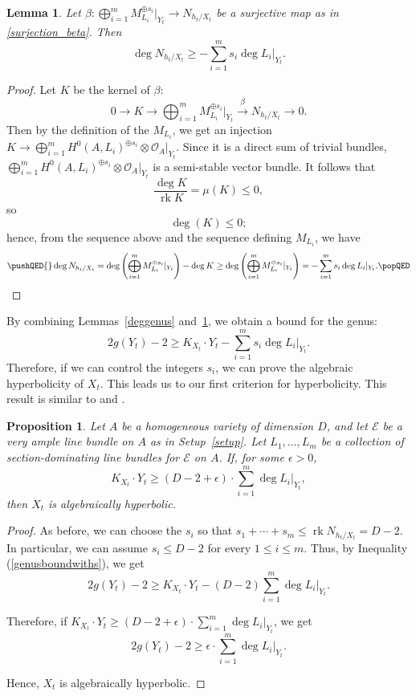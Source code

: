\documentclass[11pt]{amsart}
\numberwithin{equation}{section}
\newtheorem{lemma}[theorem]{Lemma}
\newtheorem{proposition}[theorem]{Proposition}
\theoremstyle{definition}
\theoremstyle{remark}
\newcommand{\cO}{\mathcal{O}}
\DeclareMathOperator{\rk}{rk}
\begin{document}
\begin{lemma}\label{surjectioninequality}
Let $\beta\colon \bigoplus _{i=1}^{m}M_{L_i}^{\oplus s_i}|_{Y_t}\to N_{h_t/X_t}$ be a surjective map as in \eqref{surjection_beta}. Then
\[ \deg N_{h_t/X_t}\ge -\sum_{i=1}^{m} s_i\deg L_i|_{Y_t}. \]
\end{lemma}
\begin{proof}
Let $K$ be the kernel of $\beta$:
\[ 0\longrightarrow K\longrightarrow \bigoplus _{i=1}^{m}M_{L_i}^{\oplus s_i}|_{Y_t}\overset{\beta}{\longrightarrow} N_{h_t/X_t}\longrightarrow 0. \]
Then by the definition of the $M_{L_i}$, we get an injection $K\to \bigoplus _{i=1}^{m}H^0(A,L_i)^{\oplus s_i}\otimes \cO_A|_{Y_t}$. Since it is a direct sum of trivial bundles, $\bigoplus _{i=1}^{m}H^0(A,L_i)^{\oplus s_i}\otimes \cO_A|_{Y_t}$ is a semi-stable vector bundle. It follows that
\[ \frac{\deg K}{\rk K} = \mu(K)\le 0, \]
so
\[ \deg (K)\le 0; \]
hence, from the sequence above and the sequence defining $M_{L_i}$, we have
\begin{equation*} \pushQED{\qed}
  \deg N_{h_t/X_t} = \deg \left (\bigoplus _{i=1}^{m}M_{L_i}^{\oplus s_i}|_{Y_t}\right ) - \deg K \ge \deg \left (\bigoplus _{i=1}^{m}M_{L_i}^{\oplus s_i}|_{Y_t}\right ) = -\sum_{i=1}^m s_i\deg L_i|_{Y_t}.\qedhere \popQED
  \end{equation*}
\renewcommand{\qed}{}   
\end{proof}

By combining Lemmas~\ref{deggenus} and~\ref{surjectioninequality}, we obtain a bound for the genus:
\begin{equation}\label{genusboundwiths}
     2g(Y_t)-2\ge K_{X_t}\cdot Y_t - \sum_{i=1}^{m} s_i\deg L_i|_{Y_t}.
\end{equation}
Therefore, if we can control the integers $s_i$, we can prove the algebraic hyperbolicity of $X_t$. This leads us to our first criterion for hyperbolicity. This result is similar to \cite[Corollary~2.9]{CR19} and \cite[Theorem~3.6]{HI21}.

\begin{proposition}\label{method_1}
    Let $A$ be a homogeneous variety of dimension $D$, and let $\mathcal{E}$ be a very ample line bundle on $A$ as in Setup~\ref{setup}. Let $L_1, \hdots, L_m$ be a collection of section-dominating line bundles for $\mathcal{E}$ on $A$. If, for some $\epsilon > 0$,
    \[ K_{X_t}\cdot Y_t\ge (D-2+\epsilon)\cdot \sum_{i=1}^m\deg L_i|_{Y_t}, \]
    then $X_t$ is algebraically hyperbolic.
\end{proposition}
\begin{proof}
    As before, we can choose the $s_i$ so that $s_1+\cdots +s_m\le \rk N_{h_t/X_t} = D-2$. In particular, we can assume $s_i\le D-2$ for every $1\le i\le m$. Thus, by Inequality (\ref{genusboundwiths}), we get
    \[ 2g(Y_t)-2\ge K_{X_t}\cdot Y_t - (D-2)\sum_{i=1}^{m} \deg L_i|_{Y_t}.\]
    
    Therefore, if $K_{X_t}\cdot Y_t\ge (D-2+\epsilon)\cdot \sum_{i=1}^m\deg L_i|_{Y_t}$, we get
    \[ 2g(Y_t)-2\ge \epsilon\cdot \sum_{i=1}^m\deg L_i|_{Y_t}. \]
    
    Hence, $X_t$ is algebraically hyperbolic.
\end{proof}
\end{document}
